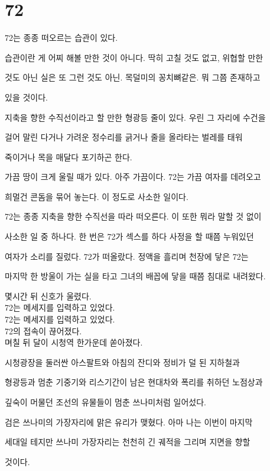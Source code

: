 \hypertarget{section}{%

\section{72}\label{section}}



72는 종종 떠오르는 습관이 있다.



습관이란 게 어찌 해볼 만한 것이 아니다. 딱히 고칠 것도 없고, 위협할 만한

것도 아닌 실은 또 그런 것도 아닌. 목덜미의 꽁치뼈같은. 뭐 그쯤 존재하고

있을 것이다.



지축을 향한 수직선이라고 할 만한 형광등 줄이 있다. 우린 그 자리에 수건을

걸어 말린 다거나 가려운 정수리를 긁거나 줄을 올라타는 벌레를 태워

죽이거나 목을 매달다 포기하곤 한다.



가끔 땅이 크게 울릴 때가 있다. 아주 가끔이다. 72는 가끔 여자를 데려오고

희멀건 콘돔을 묶어 놓는다. 이 정도로 사소한 일이다.



72는 종종 지축을 향한 수직선을 따라 떠오른다. 이 또한 뭐라 말할 것 없이

사소한 일 중 하나다. 한 번은 72가 섹스를 하다 사정을 할 때쯤 누워있던

여자가 소리를 질렀다. 72가 떠올랐다. 정액을 흘리며 천장에 닿은 72는

마지막 한 방울이 가는 실을 타고 그녀의 배꼽에 닿을 때쯤 침대로 내려왔다.



몇시간 뒤 신호가 울렸다.\\

72는 메세지를 입력하고 있었다.\\

72는 메세지를 입력하고 있었다.\\

72의 접속이 끊어졌다.\\

며칠 뒤 달이 시청역 한가운데 쏟아졌다.



시청광장을 둘러싼 아스팔트와 아침의 잔디와 정비가 덜 된 지하철과

형광등과 멈춘 기중기와 리스기간이 남은 현대차와 폭리를 취하던 노점상과

깊숙이 머물던 조선의 유물들이 멈춘 쓰나미처럼 일어섰다.



검은 쓰나미의 가장자리에 맑은 유리가 맺혔다. 아마 나는 이번이 마지막

세대일 테지만 쓰나미 가장자리는 천천히 긴 궤적을 그리며 지면을 향할

것이다.

